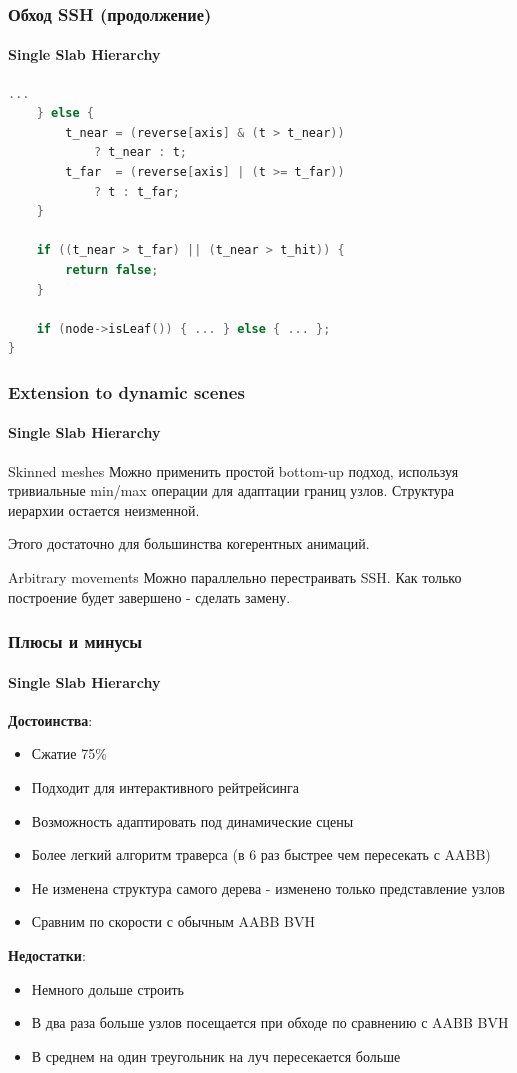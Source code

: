 \begin{frame}[fragile]
    \frametitle{Обход SSH (продолжение)}
    \framesubtitle{Single Slab Hierarchy}

    \begin{lstlisting}[language=C++,basicstyle=\ttfamily,keywordstyle=\color{blue}]
    ...
    } else {
        t_near = (reverse[axis] & (t > t_near))
            ? t_near : t;
        t_far  = (reverse[axis] | (t >= t_far))
            ? t : t_far;
    }

    if ((t_near > t_far) || (t_near > t_hit)) {
        return false;
    }

    if (node->isLeaf()) { ... } else { ... };
}
    \end{lstlisting}
\end{frame}

\begin{frame}
    \frametitle{Extension to dynamic scenes}
    \framesubtitle{Single Slab Hierarchy}
    \begin{block}{Skinned meshes}
        Можно применить простой bottom-up подход,
        используя тривиальные min/max операции для адаптации границ узлов.
        Структура иерархии остается неизменной.

        Этого достаточно для большинства когерентных анимаций.
    \end{block}

    \begin{block}{Arbitrary movements}
        Можно параллельно перестраивать SSH. Как только построение будет завершено - сделать замену.
    \end{block}

\end{frame}

\begin{frame}[t]
    \frametitle{Плюсы и минусы}
    \framesubtitle{Single Slab Hierarchy}
    \textbf{Достоинства}:
    \begin{itemize}
        \item
            Сжатие 75\%
        \item
            Подходит для интерактивного рейтрейсинга
        \item
            Возможность адаптировать под динамические сцены
        \item
            Более легкий алгоритм траверса (в 6 раз быстрее чем пересекать с AABB)
        \item
            Не изменена структура самого дерева - изменено только представление узлов
        \item
            Сравним по скорости с обычным AABB BVH
    \end{itemize}
    \textbf{Недостатки}:
    \begin{itemize}
        \item
            Немного дольше строить
        \item
            В два раза больше узлов посещается при обходе по сравнению с AABB BVH
        \item
            В среднем на один треугольник на луч пересекается больше
    \end{itemize}
\end{frame}

